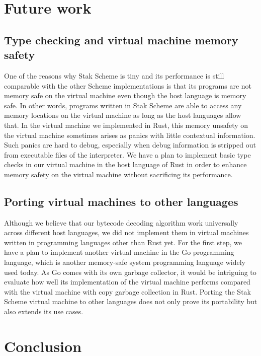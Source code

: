 \documentclass[sigplan]{acmart}
\begin{document}
\section{Future work}

\subsection{Type checking and virtual machine memory safety}

One of the reasons why Stak Scheme is tiny and its performance is still
comparable with the other Scheme implementations is that its
programs are not memory safe on the virtual machine even though
the host language is memory safe.
In other words, programs written in Stak Scheme are able to access any memory
locations on the virtual machine as long as the host languages allow that.
In the virtual machine we implemented in Rust, this memory
unsafety on the virtual machine sometimes arises as panics with little
contextual information.
Such panics are hard to debug, especially when debug information is
stripped out from executable files of the interpreter.
We have a plan to implement basic type checks in our virtual machine
in the host language of Rust in order to enhance memory safety on
the virtual machine without sacrificing its performance.

\subsection{Porting virtual machines to other languages} \label{portvm}

Although we believe that our bytecode decoding algorithm work
universally across different host languages, we did not implement them in
virtual machines written in programming languages other than Rust yet.
For the first step, we have a plan to implement another virtual
machine in the Go programming language, which is another memory-safe system
programming language widely used today.
As Go comes with its own garbage collector,
it would be intriguing to evaluate how well its implementation of the
virtual machine performs compared with the virtual
machine with copy garbage collection in Rust.
Porting the Stak Scheme virtual machine to other languages does
not only prove its portability but also extends its use cases.

\section{Conclusion}
\end{document}
